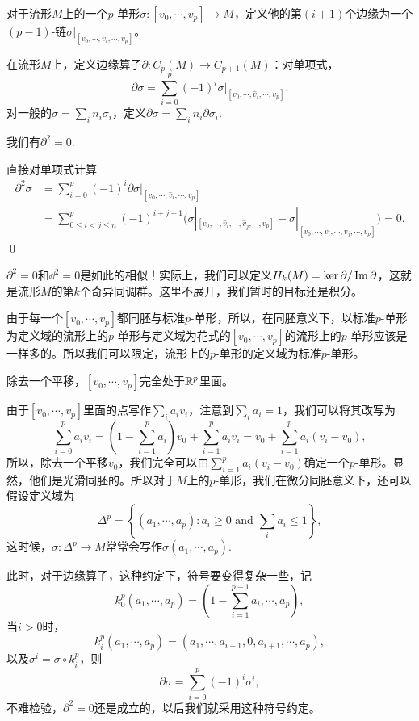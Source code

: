 对于流形$M$上的一个$p$-单形$\sigma:[v_0,\cdots,v_p]\to M$，定义他的第$(i+1)$个边缘为一个$(p-1)$-链$\sigma|_{[v_0,\cdots,\hat{v}_i,\cdots,v_p]}$。

\para 在流形$M$上，定义边缘算子$\partial:C_p(M)\to C_{p+1}(M)$：对单项式，
\[
	\partial \sigma=\sum_{i=0}^p (-1)^i\sigma|_{[v_0,\cdots,\hat{v}_i,\cdots,v_p]}.
\]
对一般的$\sigma=\sum_i n_i \sigma_i$，定义$\partial \sigma =\sum_i n_i \partial \sigma_i$.

\para 我们有$\partial^2=0$.

\proof 直接对单项式计算
\[
\begin{split}
	\partial^2 \sigma&=\sum_{i=0}^p (-1)^i\partial\sigma|_{[v_0,\cdots,\hat{v}_i,\cdots,v_p]}\\
	&=\sum_{0\leq i<j\leq n}^p (-1)^{i+j-1}\bigl(\sigma|_{[v_0,\cdots,\hat{v}_i,\cdots,\hat{v}_j,\cdots,v_p]}-\sigma|_{[v_0,\cdots,\hat{v}_i,\cdots,\hat{v}_j,\cdots,v_p]}\bigr)=0.
\end{split}
\]\qed

$\partial^2=0$和$\dd^2=0$是如此的相似！实际上，我们可以定义$H_k(M)=\ker\partial/\operatorname{Im}\partial$，这就是流形$M$的第$k$个奇异同调群。这里不展开，我们暂时的目标还是积分。

\para 由于每一个$[v_0,\cdots,v_p]$都同胚与标准$p$-单形，所以，在同胚意义下，以标准$p$-单形为定义域的流形上的$p$-单形与定义域为花式的$[v_0,\cdots,v_p]$的流形上的$p$-单形应该是一样多的。所以我们可以限定，流形上的$p$-单形的定义域为标准$p$-单形。

\para 除去一个平移，$[v_0,\cdots,v_p]$完全处于$\mathbb{R}^p$里面。

由于$[v_0,\cdots,v_p]$里面的点写作$\sum_i a_i v_i$，注意到$\sum_i a_i=1$，我们可以将其改写为
\[
	\sum_{i=0}^pa_iv_i=\left(1-\sum_{i=1}^pa_i\right)v_0+\sum_{i=1}^pa_iv_i=v_0+\sum_{i=1}^pa_i(v_i-v_0),
\]
所以，除去一个平移$v_0$，我们完全可以由$\sum_{i=1}^pa_i(v_i-v_0)$确定一个$p$-单形。显然，他们是光滑同胚的。所以对于$M$上的$p$-单形，我们在微分同胚意义下，还可以假设定义域为
\[
	\Delta^p=\left\{(a_1,\cdots,a_p):a_i\geq 0\text{ and }\sum_i a_i\leq 1\right\},
\]
这时候，$\sigma:\Delta^p\to M$常常会写作$\sigma(a_1,\cdots,a_p)$.

此时，对于边缘算子，这种约定下，符号要变得复杂一些，记
\[
	k^p_0(a_1,\cdots,a_{p})=\left(1-\sum_{i=1}^{p-1}a_i,\cdots,a_{p}\right),
\]
当$i>0$时，
\[
	k^p_i(a_1,\cdots,a_{p})=(a_1,\cdots,a_{i-1},0,a_{i+1},\cdots,a_{p}),
\]
以及$\sigma^i=\sigma\circ k^p_i$，则
\[
	\partial\sigma=\sum_{i=0}^p(-1)^i \sigma^i,
\]
不难检验，$\partial^2=0$还是成立的，以后我们就采用这种符号约定。

